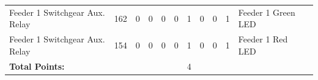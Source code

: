 \begin{table}[!htp]
{\begin{tabular}{lcccccccccll}
			Feeder 1 Switchgear Aux. Relay          & 162                     & 0                                           & 0                                          & 0           & 0           & 1            & 0                & 0 & 1                            & Feeder 1 Green LED               &                \\
			Feeder 1 Switchgear Aux. Relay          & 154                     & 0                                           & 0                                          & 0           & 0           & 1            & 0                & 0 & 1                            & Feeder 1 Red LED                 &                \\ \midrule
			\textbf{Total Points:}                  &                         &                                             &                                            &             &             & 4            &                  &   &                              &                                  &                \\ \bottomrule
		\end{tabular}
	}
\end{table}
